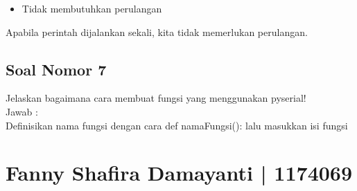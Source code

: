\begin{itemize}
\item Tidak membutuhkan perulangan
\end{itemize}
Apabila perintah dijalankan sekali, kita tidak memerlukan perulangan.

\subsection{Soal Nomor 7}
Jelaskan bagaimana cara membuat fungsi yang menggunakan pyserial!\\
Jawab :\\
Definisikan nama fungsi dengan cara def namaFungsi(): lalu masukkan isi fungsi


\section{Fanny Shafira Damayanti | 1174069}
